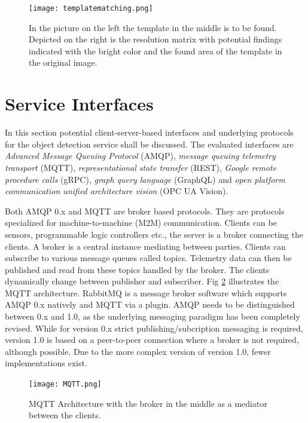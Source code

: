 \begin{figure}[ht]
	\centering
  \texttt{[image: templatematching.png]}
	\caption{In the picture on the left the template in the middle is to be found. Depicted on the right is the resolution matrix with potential findings indicated with the bright color and the found area of the template in the original image.\cite{Documentation.LastVisited2018-11-15.2014TemplateMatching}}
	\label{templatematching}
\end{figure}

\section {Service Interfaces}
\label{serviceinterfaces}
In this section potential client-server-based interfaces and underlying protocols for the object detection service shall be discussed. The evaluated interfaces are \textit{Advanced Message Queuing Protocol} (AMQP), \textit{message queuing telemetry transport} (MQTT), \textit{representational state transfer} (REST), \textit{Google remote procedure calls} (gRPC), \textit{graph query language} (GraphQL) and \textit{open platform communication unified architecture vision} (OPC UA Vision). \newline

Both AMQP 0.x and MQTT are broker based protocols. They are protocols specialized for machine-to-machine (M2M) communication. Clients can be sensors, programmable logic controllers etc., the server is a broker connecting the clients. A broker is a central instance mediating between parties. Clients can subscribe to various message queues called topics. Telemetry data can then be published and read from these topics handled by the broker. The clients dynamically change between publisher and subscriber. Fig \ref{MQTT} illustrates the MQTT architecture.  \cite{Banks2014MQTT3.1.1} RabbitMQ is a message broker software which supports AMQP 0.x natively and MQTT via a plugin. \cite{Lastvisited2018-15-122018WhichSupport} AMQP needs to be distinguished between 0.x and 1.0, as the underlying messaging paradigm has been completely revised. While for version 0.x strict publishing/subcription messaging is required, version 1.0 is based on a peer-to-peer connection where a broker is not required, although possible. Due to the more complex version of version 1.0, fewer implementations exist. \cite{Dizdarevic2018SurveyIntegration}

\begin{figure}[ht]
	\centering
  \texttt{[image: MQTT.png]}
	\caption{MQTT Architecture with the broker in the middle as a mediator between the clients.\cite{2018-11-24Pure-javascript-MQTT-broker}}
	\label{MQTT}
\end{figure}

